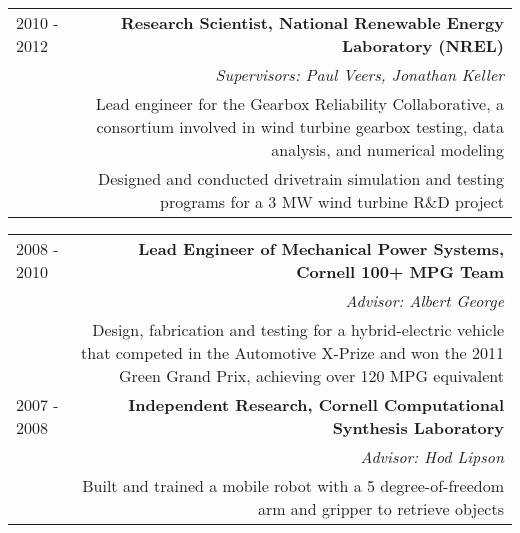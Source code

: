 \begin{tabular}{L!{\VRule}R}
2010 - 2012& {\bf Research Scientist, National Renewable Energy Laboratory (NREL)} \\
& {\it Supervisors: Paul Veers, Jonathan Keller} \\
& Lead engineer for the Gearbox Reliability Collaborative, a consortium involved in wind turbine gearbox testing, data analysis, and numerical modeling \\
& Designed and conducted drivetrain simulation and testing programs for a 3 MW wind turbine R\&D project \\
\end{tabular}

\noindent \begin{tabular}{L!{\VRule}R}
2008 - 2010& {\bf Lead Engineer of Mechanical Power Systems, Cornell 100+ MPG Team} \\
& {\it Advisor: Albert George} \\
& Design, fabrication and testing for a hybrid-electric vehicle that competed in the Automotive X-Prize and won the 2011 Green Grand Prix, achieving over 120 MPG equivalent\\
2007 - 2008& {\bf Independent Research, Cornell Computational Synthesis Laboratory} \\
& {\it Advisor: Hod Lipson}\\
&Built and trained a mobile robot with a 5 degree-of-freedom arm and gripper to retrieve objects \\
\end{tabular}
